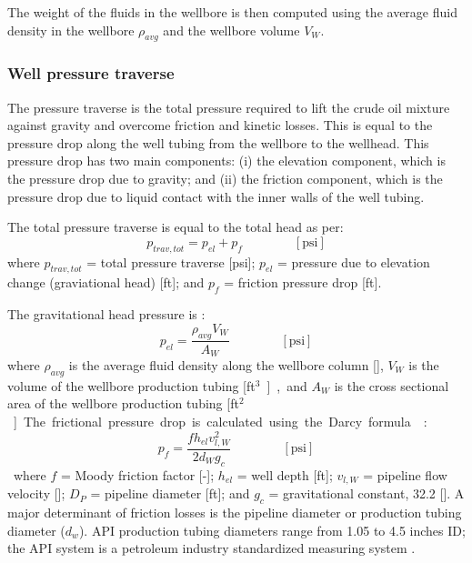 \documentclass[11pt]{report}
\newcommand{\eqnunit}[1]{\quad\quad \scriptstyle{\left[\text{#1}\right]}}
\begin{document}
The weight of the fluids in the wellbore is then computed using the average fluid density in the wellbore $\rho_{avg}$ and the wellbore volume $V_W$.

\subsubsection{Well pressure traverse}

The pressure traverse is the total pressure required to lift the crude oil mixture against gravity and overcome friction and kinetic losses. This is equal to the pressure drop along the well tubing from the wellbore to the wellhead. This pressure drop has two main components: (i) the elevation component, which is the pressure drop due to gravity; and (ii) the friction component, which is the pressure drop due to liquid contact with the inner walls of the well tubing.

The total pressure traverse is equal to the total head as per: 
\begin{equation} \label{eq:total_head}
p_{trav,tot}= p_{el} + p_{f} \quad\quad\eqnunit{psi}
\end{equation}
where $p_{trav,tot}$ = total pressure traverse [\unit{psi}]; $p_{el}$ = pressure due to elevation change (graviational head) [\unit{ft}]; and $p_{f}$ = friction pressure drop [\unit{ft}]. 

The gravitational head pressure is \cite[Table 1, p. 455]{Mcallister2009}:
\begin{equation} \label{eq:pressure_traverse}
p_{el} = \frac{\rho_{avg} V_{W}}{A_W}  \quad\quad\eqnunit{psi}
\end{equation}
where $\rho_{avg}$ is the average fluid density along the wellbore column [], $V_{W}$ is the volume of the wellbore production tubing [\unit{ft$^3$}], and $A_W$ is the cross sectional area of the wellbore production tubing [\unit{ft$^2$}].

The frictional pressure drop is calculated using the Darcy formula \cite[p. 447]{Mcallister2009}:
\begin{equation} \label{eq:friction_head}
p_{f}=\frac{fh_{el}{v_{l,W}^2}}{2d_{W}{g_{c}}} \quad\quad\eqnunit{psi}
\end{equation}
where $f$ = Moody friction factor [-]; $h_{el}$ = well depth [\unit{ft}]; $v_{l,W}$ = pipeline flow velocity []; $D_{P}$ = pipeline diameter [\unit{ft}]; and $g_{c}$ = gravitational constant, 32.2 []. A major determinant of friction losses is the pipeline diameter or production tubing diameter ($d_{w}$). API production tubing diameters range from 1.05 to 4.5 inches ID; the API system is a petroleum industry standardized measuring system \cite[p. 106]{Clegg2007}.
\end{document}
